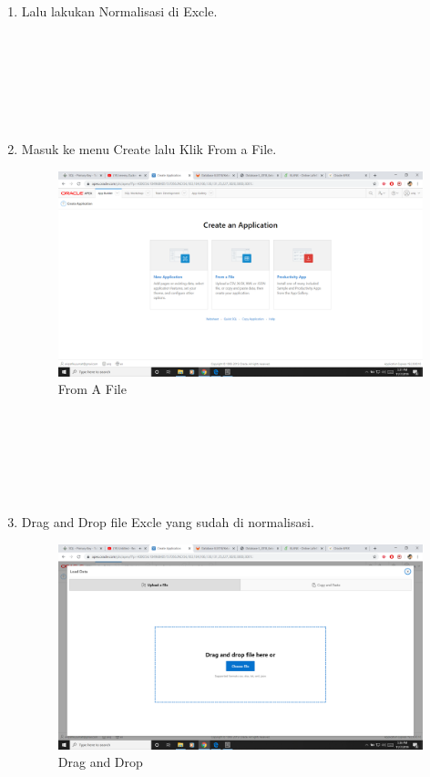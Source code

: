 \documentclass[12pt, times new roman]{article}
\begin{document}
\begin{enumerate}
\item Lalu lakukan Normalisasi di Excle.
\\
\\
\\
\\
\\
\\
\\
\item Masuk ke menu Create lalu Klik From a File.
\begin{figure}[h]
	\centering
		\includegraphics[scale=0.2]{Gambar/Capture2}
	\caption{From A File}
\end{figure}
\\
\\
\\
\\
\\
\item Drag and Drop file Excle yang sudah di normalisasi.
\begin{figure}[h]
	\centering 
		\includegraphics[scale=0.2]{Gambar/Capture3}
	\caption{Drag and Drop}
\end{figure}

\end{enumerate}
\end{document}
